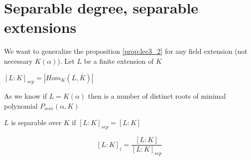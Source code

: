 \section{Separable degree, separable extensions}

We want to generalize the proposition \ref{prop:lec3_2} for any field
extension (not necessary $K\left(\alpha\right)$).
Let $L$ be a finite extension of $K$

\begin{definition}
  $\left[L:K\right]_{sep} = \left|Hom_K\left(L, \bar{K}\right)\right|$  
  \label{def:separabledegree}
\end{definition}

As we know if $L = K\left(\alpha\right)$ then
 is a number of distinct roots of
minimal polynomial $P_{min}\left(\alpha, K\right)$

\begin{definition}
  $L$ is separable over $K$ if
  $\left[L:K\right]_{sep} = \left[L:K\right]$
  \label{def:separableextension}
\end{definition}

\begin{definition}
  \[
  \left[L:K\right]_i =
  \frac{\left[L:K\right]}{\left[L:K\right]_{sep}}
  \]
  \label{def:inseparabledegree}
\end{definition}

